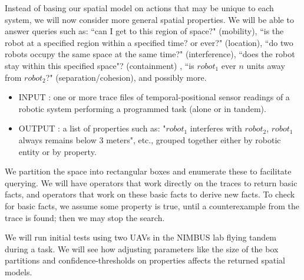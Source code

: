 \documentclass{article}
\begin{document}
%
%
%
Instead of basing our spatial model on actions that may be unique to each system, we will now consider more general spatial properties.
We will be able to answer queries such as: ``can I get to this region of space?" (mobility), ``is the robot at a specified region within a specified time? or ever?" (location), ``do two robots occupy the same space at the same time?" (interference), ``does the robot stay within this specified space"? (containment) , ``is $robot_1$ ever $n$ units away from $robot_2$?" (separation/cohesion), and possibly more.

\begin{itemize}
  \item INPUT : one or more trace files of temporal-positional sensor readings of a robotic system performing a programmed task (alone or in tandem).

  \item OUTPUT : a list of properties such as: "$robot_1$ interferes with $robot_2$, $robot_1$ always remains below 3 meters", etc., grouped together either by robotic entity or by property.
\end{itemize} 
 
We partition the space into rectangular boxes and enumerate these to facilitate querying.
We will have operators that work directly on the traces to return basic facts, and operators that work on these basic facts to derive new facts.
To check for basic facts, we assume some property is true, until a counterexample from the trace is found; then we may stop the search.
  
We will run initial tests using two UAVs in the NIMBUS lab flying tandem during a task.  
We will see how adjusting parameters like the size of the box partitions and confidence-thresholds on properties affects the returned spatial models. 




\end{document}
